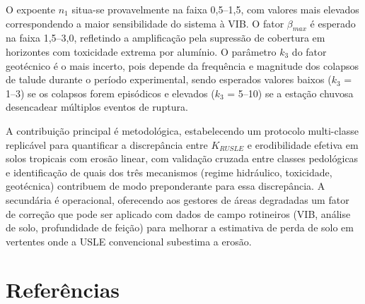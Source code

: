 \documentclass[
  brazilian,
  authoryear,
  preprint]{elsarticle}
\begin{document}
O expoente \(n_1\) situa-se provavelmente na faixa 0,5--1,5, com valores
mais elevados correspondendo a maior sensibilidade do sistema à VIB. O
fator \(\beta_{max}\) é esperado na faixa 1,5--3,0, refletindo a
amplificação pela supressão de cobertura em horizontes com toxicidade
extrema por alumínio. O parâmetro \(k_3\) do fator geotécnico é o mais
incerto, pois depende da frequência e magnitude dos colapsos de talude
durante o período experimental, sendo esperados valores baixos (\(k_3\)
= 1--3) se os colapsos forem episódicos e elevados (\(k_3\) = 5--10) se
a estação chuvosa desencadear múltiplos eventos de ruptura.

A contribuição principal é metodológica, estabelecendo um protocolo
multi-classe replicável para quantificar a discrepância entre
\(K_{RUSLE}\) e erodibilidade efetiva em solos tropicais com erosão
linear, com validação cruzada entre classes pedológicas e identificação
de quais dos três mecanismos (regime hidráulico, toxicidade, geotécnica)
contribuem de modo preponderante para essa discrepância. A secundária é
operacional, oferecendo aos gestores de áreas degradadas um fator de
correção que pode ser aplicado com dados de campo rotineiros (VIB,
análise de solo, profundidade de feição) para melhorar a estimativa de
perda de solo em vertentes onde a USLE convencional subestima a erosão.

\section{Referências}\label{referuxeancias}

\renewcommand{\bibsection}{}

\end{document}
